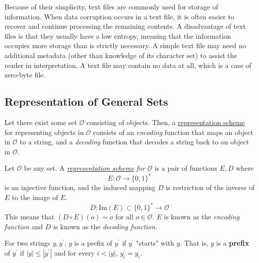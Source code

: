     Because of their simplicity, text files are commonly used for storage of information. When data corruption occurs in a text file, it is often easier to recover and continue processing the remaining contents. A disadvantage of text files is that they usually have a low entropy, meaning that the information occupies more storage than is strictly necessary. A simple text file may need no additional metadata (other than knowledge of its character set) to assist the reader in interpretation. A text file may contain no data at all, which is a case of zero-byte file.

\subsection{Representation of General Sets}

  Let there exist some set $\mathcal{O}$ consisting of objects. Then, a \hyperref[def:representation-scheme]{representation scheme} for representing objects in $\mathcal{O}$ consists of an \textit{encoding} function that maps an object in $\mathcal{O}$ to a string, and a \textit{decoding} function that decodes a string back to an object in $\mathcal{O}$. 

  \begin{definition}
    \label{def:representation-scheme-2}
  Let $\mathcal{O}$ be any set. A \textit{\hyperref[def:representation-scheme]{representation scheme} for $\mathcal{O}$} is a pair of functions $E, D$ where 
  \begin{equation}
    E: \mathcal{O} \to \{0,1\}^\ast
  \end{equation}
  is an injective function, and the induced mapping $D$ is restriction of the inverse of $E$ to the image of $E$. 
  \begin{equation}
    D: \mathrm{Im}(E) \subset \{0,1\}^\ast \to \mathcal{O}
  \end{equation}
  This means that $(D \circ E) (o) = o$ for all $o \in \mathcal{O}$. $E$ is known as the \textit{encoding function} and $D$ is known as the \textit{decoding function}. 
  \end{definition}

  \begin{definition}[Prefix]
    \label{def:prefix}
  For two strings $y, y^\prime$, $y$ is a prefix of $y^\prime$ if $y^\prime$ "starts" with $y$. That is, $y$ is a \textbf{prefix} of $y^\prime$ if $|y| \leq |y^\prime|$ and for every $i<|y|$, $y_i^\prime = y_i$. 
  \end{definition}

